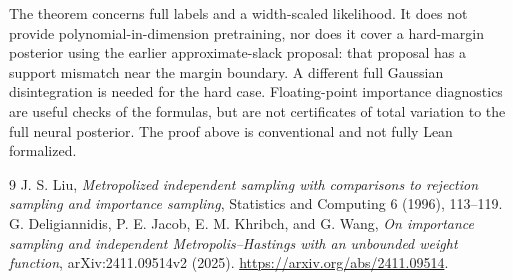 \documentclass[11pt]{article}
\begin{document}
The theorem concerns full labels and a width-scaled likelihood. It does
not provide polynomial-in-dimension pretraining, nor does it cover a
hard-margin posterior using the earlier approximate-slack proposal:
that proposal has a support mismatch near the margin boundary. A
different full Gaussian disintegration is needed for the hard case.
Floating-point importance diagnostics are useful checks of the formulas,
but are not certificates of total variation to the full neural posterior.
The proof above is conventional and not fully Lean formalized.

\begin{thebibliography}{9}
 J. S. Liu, \emph{Metropolized independent sampling with
comparisons to rejection sampling and importance sampling}, Statistics
and Computing 6 (1996), 113--119.
 G. Deligiannidis, P. E. Jacob, E. M. Khribch, and G. Wang,
\emph{On importance sampling and independent Metropolis--Hastings with an
unbounded weight function}, arXiv:2411.09514v2 (2025).
\url{https://arxiv.org/abs/2411.09514}.
\end{thebibliography}
\end{document}
